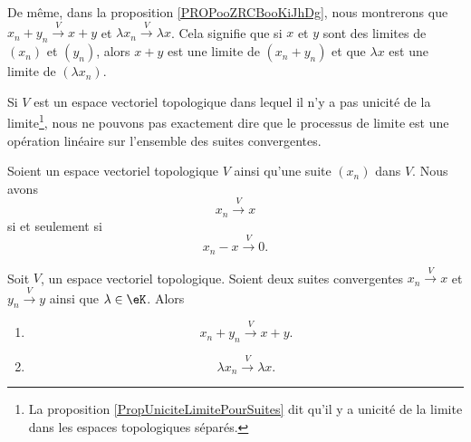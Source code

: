 De même, dans la proposition \ref{PROPooZRCBooKiJhDg}, nous montrerons que \( x_n+y_n\stackrel{V}{\longrightarrow}x+y\) et \( \lambda x_n\stackrel{ V}{\longrightarrow}\lambda x\). Cela signifie que si \( x\) et \( y\) sont des limites de \( (x_n)\) et \( (y_n)\), alors \( x+y\) est une limite de \( (x_n+y_n)\) et que \( \lambda x\) est une limite de \( (\lambda x_n)\).

Si \( V\) est un espace vectoriel topologique dans lequel il n'y a pas unicité de la limite\footnote{La proposition \ref{PropUniciteLimitePourSuites} dit qu'il y a unicité de la limite dans les espaces topologiques séparés.}, nous ne pouvons pas exactement dire que le processus de limite est une opération linéaire sur l'ensemble des suites convergentes.

\begin{lemma}       \label{LEMooJDJVooHUKdSe}
	Soient un espace vectoriel topologique \( V\) ainsi qu'une suite \( (x_n)\) dans \( V\). Nous avons
	\begin{equation}
		x_n\stackrel{V}{\longrightarrow}x
	\end{equation}
	si et seulement si
	\begin{equation}
		x_n-x\stackrel{V}{\longrightarrow}0.
	\end{equation}
\end{lemma}

\begin{proposition}        \label{PROPooZRCBooKiJhDg}
	Soit \( V\), un espace vectoriel topologique. Soient deux suites convergentes \( x_n\stackrel{V}{\longrightarrow}x\) et \( y_n\stackrel{V}{\longrightarrow}y\) ainsi que \( \lambda\in \eK\). Alors
	\begin{enumerate}
		\item       \label{ITEMooSHPAooQyEkgT}
		      \begin{equation}
			      x_n+y_n\stackrel{V}{\longrightarrow}x+y.
		      \end{equation}
		\item   \label{ITEMooYHHYooYATzWE}
		      \begin{equation}
			      \lambda x_n\stackrel{V}{\longrightarrow}\lambda x.
		      \end{equation}
	\end{enumerate}
\end{proposition}

